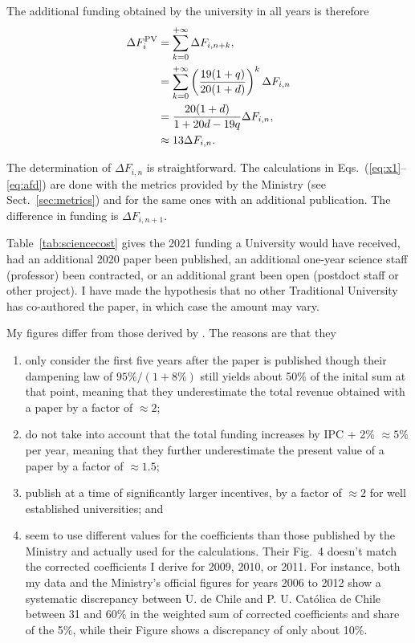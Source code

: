 \documentclass[twocolumn]{article}
\def\eqsref#1#2{Eqs.~(\ref{eq:#1}--\ref{eq:#2})}
\begin{document}
The additional funding obtained by the university in all years is therefore
\begin{align}
    \Delta F_{i}^\text{PV}
         &= \sum_{k=0}^{+\infty} \Delta F_{i,n+k}, \notag \\
         &= \sum_{k=0}^{+\infty} \left(
                        \frac{19(1 + q)}{20(1 + d)}  \right)^k\Delta F_{i,n} \notag \\
                 &= \frac{20(1+d)}{1 + 20d - 19q} \Delta F_{i,n}, \\
                 &\approx 13 \Delta F_{i,n}. \notag
\end{align}

The determination of $\Delta F_{i,n}$ is straightforward.  The calculations
in \eqsref{x1}{afd} are done with the metrics provided by the Ministry (see Sect.~\ref{sec:metrics}) and for the same ones with an additional publication.  The difference in funding is $\Delta F_{i,n+1}$. 

Table~\ref{tab:sciencecost} gives the 2021 funding a University would have received, had an additional 2020 paper been published, an additional one-year science staff (professor) been contracted, or an additional grant been open (postdoct staff or other project).  I have made the hypothesis that no other Traditional University has co-authored the paper, in which case the amount may vary. 

My figures differ from those derived by \citet{RAM12}.  The reasons are that they
\begin{enumerate}
\item only consider the first five years after the paper is published though their dampening law of $95\% / (1 + 8\%)$ still yields about 50\% of the inital sum at that point, meaning that they underestimate the total revenue obtained with a paper by a factor of $\approx 2$;
\item do not take into account that the total funding increases by IPC + 2\% $\approx 5$\% per year, meaning that they further underestimate the present value of a paper by a factor of $\approx 1.5$;
\item publish at a time of significantly larger incentives, by a factor of $\approx 2$ for well established universities; and
\item seem to use different values for the coefficients than those published by the Ministry and actually used for the calculations. Their Fig.~4 doesn't match the corrected coefficients I derive for 2009, 2010, or 2011. For instance, both my data and the Ministry's official figures for years 2006 to 2012 show a systematic discrepancy between U. de Chile and P. U. Católica de Chile between 31 and 60\% in the weighted sum of corrected coefficients and share of the 5\%, while their Figure shows a discrepancy of only about 10\%.
\end{enumerate}
\end{document}
